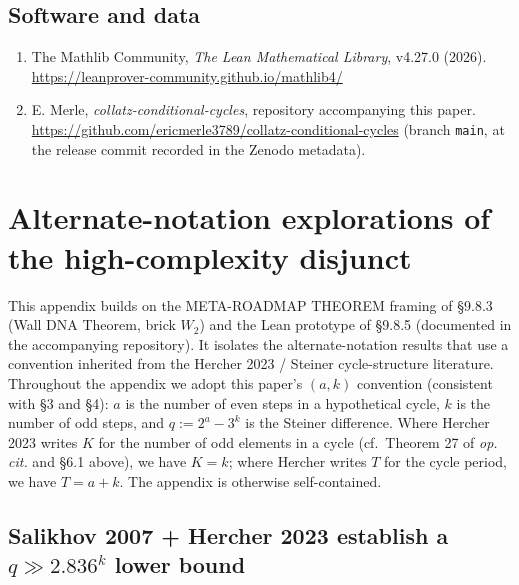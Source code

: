 \documentclass[
  11pt]{amsart}
\providecommand{\tightlist}{%
  \setlength{\itemsep}{0pt}\setlength{\parskip}{0pt}}
\theoremstyle{plain}
\theoremstyle{definition}
\theoremstyle{remark}
\begin{document}
\subsection*{Software and data}\label{software-and-data}

\begin{enumerate}
\def\labelenumi{\arabic{enumi}.}
\setcounter{enumi}{23}
\tightlist
\item
  The Mathlib Community, \emph{The Lean Mathematical Library}, v4.27.0
  (2026). \url{https://leanprover-community.github.io/mathlib4/}
\item
  E. Merle, \emph{collatz-conditional-cycles}, repository accompanying
  this paper.
  \url{https://github.com/ericmerle3789/collatz-conditional-cycles}
  (branch \texttt{main}, at the release commit recorded in the Zenodo
  metadata).
\end{enumerate}

\appendix

\section{Alternate-notation explorations of the high-complexity
disjunct}\label{alternate-notation-explorations-of-the-high-complexity-disjunct}

This appendix builds on the META-ROADMAP THEOREM framing of §9.8.3 (Wall
DNA Theorem, brick \(W_2\)) and the Lean prototype of §9.8.5 (documented
in the accompanying repository). It isolates the alternate-notation
results that use a convention inherited from the Hercher 2023 / Steiner
cycle-structure literature. Throughout the appendix we adopt this
paper's \((a, k)\) convention (consistent with §3 and §4): \(a\) is the
number of even steps in a hypothetical cycle, \(k\) is the number of odd
steps, and \(q := 2^a - 3^k\) is the Steiner difference. Where Hercher
2023 writes \(K\) for the number of odd elements in a cycle (cf.~Theorem
27 of \emph{op. cit.} and §6.1 above), we have \(K = k\); where Hercher
writes \(T\) for the cycle period, we have \(T = a + k\). The appendix
is otherwise self-contained.

\subsection{\texorpdfstring{Salikhov 2007 + Hercher 2023 establish a
\(q \gg 2.836^k\) lower
bound}{Salikhov 2007 + Hercher 2023 establish a q \textbackslash gg 2.836\^{}k lower bound}}\label{salikhov-2007-hercher-2023-establish-a-q-gg-2.836k-lower-bound}
\end{document}
